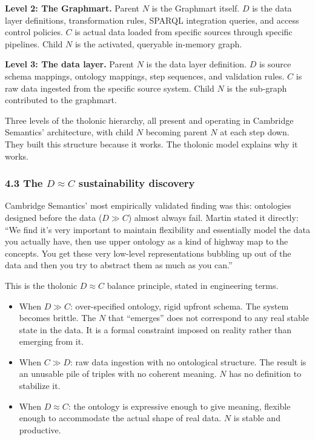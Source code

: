 \documentclass[
  11pt,
  letterpaper,
]{article}
\providecommand{\tightlist}{%
  \setlength{\itemsep}{0pt}\setlength{\parskip}{0pt}}
\begin{document}
\textbf{Level 2: The Graphmart.} Parent \(N\) is the Graphmart itself.
\(D\) is the data layer definitions, transformation rules, SPARQL
integration queries, and access control policies. \(C\) is actual data
loaded from specific sources through specific pipelines. Child \(N\) is
the activated, queryable in-memory graph.

\textbf{Level 3: The data layer.} Parent \(N\) is the data layer
definition. \(D\) is source schema mappings, ontology mappings, step
sequences, and validation rules. \(C\) is raw data ingested from the
specific source system. Child \(N\) is the sub-graph contributed to the
graphmart.

Three levels of the tholonic hierarchy, all present and operating in
Cambridge Semantics' architecture, with child \(N\) becoming parent
\(N\) at each step down. They built this structure because it works. The
tholonic model explains why it works.

\subsubsection{\texorpdfstring{4.3 The \(D \approx C\) sustainability
discovery}{4.3 The D \textbackslash approx C sustainability discovery}}\label{the-d-approx-c-sustainability-discovery}

Cambridge Semantics' most empirically validated finding was this:
ontologies designed before the data (\(D \gg C\)) almost always fail.
Martin stated it directly: ``We find it's very important to maintain
flexibility and essentially model the data you actually have, then use
upper ontology as a kind of highway map to the concepts. You get these
very low-level representations bubbling up out of the data and then you
try to abstract them as much as you can.''

This is the tholonic \(D \approx C\) balance principle, stated in
engineering terms.

\begin{itemize}
\tightlist
\item
  When \(D \gg C\): over-specified ontology, rigid upfront schema. The
  system becomes brittle. The \(N\) that ``emerges'' does not correspond
  to any real stable state in the data. It is a formal constraint
  imposed on reality rather than emerging from it.
\item
  When \(C \gg D\): raw data ingestion with no ontological structure.
  The result is an unusable pile of triples with no coherent meaning.
  \(N\) has no definition to stabilize it.
\item
  When \(D \approx C\): the ontology is expressive enough to give
  meaning, flexible enough to accommodate the actual shape of real data.
  \(N\) is stable and productive.
\end{itemize}
\end{document}
